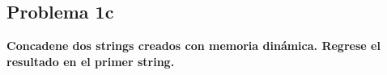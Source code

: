 \subsection*{Problema 1c}

\textbf{Concadene dos strings creados con memoria dinámica. Regrese el resultado en el primer string.}